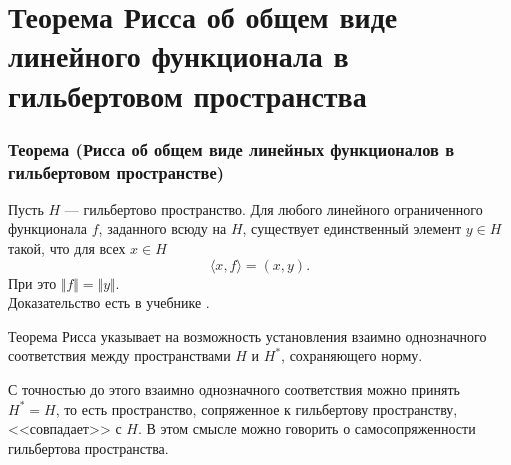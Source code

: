 \section{Теорема Рисса об общем виде линейного функционала в гильбертовом пространства}
\label{sec:q-26}
\subsubsection*{Теорема (Рисса об общем виде линейных функционалов в гильбертовом пространстве)}
Пусть $H$ --- гильбертово пространство. Для любого линейного ограниченного функционала $f$, заданного всюду на $H$, существует единственный элемент $y \in H$ такой, что для всех $x \in H$
$$\langle x, f \rangle = (x, y).$$
При это $\Vert f \Vert = \Vert y \Vert$.\\
Доказательство есть в учебнике \cite[с.~171]{trenogin}.

Теорема Рисса указывает на возможность установления взаимно однозначного соответствия между пространствами $H$ и $H^*$, сохраняющего норму.

С точностью до этого взаимно однозначного соответствия можно принять $H^* = H$, то есть пространство, сопряженное к гильбертову пространству, <<совпадает>> с $H$. В этом смысле можно говорить о самосопряженности гильбертова пространства.